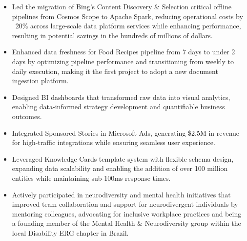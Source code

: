 \begin{itemize}
    \item \scriptsize{Led the migration of Bing's Content Discovery \& Selection critical offline
        pipelines from Cosmos Scope to Apache Spark, reducing operational costs by ~20\% across
        large-scale data platform services while enhancing performance, resulting in potential savings
        in the hundreds of millions of dollars.}

    \item \scriptsize{Enhanced data freshness for Food Recipes pipeline from 7 days to under 2 days by
        optimizing pipeline performance and transitioning from weekly to daily execution, making it the
        first project to adopt a new document ingestion platform.}
    
    \item \scriptsize{Designed BI dashboards that transformed raw data into visual analytics, enabling 
        data-informed strategy development and quantifiable business outcomes.}
    
    \item \scriptsize{Integrated Sponsored Stories in Microsoft Ads, generating \$2.5M in revenue for
        high-traﬀic integrations while ensuring seamless user experience.}
    
    \item \scriptsize{Leveraged Knowledge Cards template system with flexible schema design, expanding
        data scalability and enabling the addition of over 100 million entities while maintaining
        sub-100ms response times.}
    
    \item \scriptsize{Actively participated in neurodiversity and mental health initiatives that
        improved team collaboration and support for neurodivergent individuals by mentoring colleagues,
        advocating for inclusive workplace practices and being a founding member of the Mental Health \&
        Neurodiversity group within the local Disability ERG chapter in Brazil.}
\end{itemize}